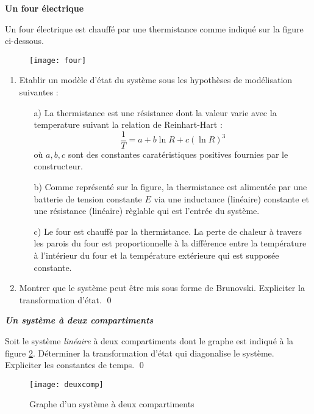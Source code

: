 \begin{exercice}{\bf Un four électrique}

Un four électrique est chauffé par une thermistance comme indiqué sur la figure ci-dessous.
\begin{figure}[h]
\begin{center}
\texttt{[image: four]}
\label{four}
\end{center}
\vspace{-5mm}
\end{figure}
\begin{enumerate}
\item Etablir un modèle d'état du système sous les hypothèses de modélisation suivantes :
\begin{itemize}
\item[a)] La thermistance est une résistance dont la valeur varie avec la temperature suivant la relation de Reinhart-Hart :
\begin{equation*}
\dfrac{1}{T} = a + b \ln R + c (\ln R)^3
\end{equation*}
où $a, b, c$ sont des constantes caratéristiques positives fournies par le constructeur.
\item [b)] Comme représenté sur la figure, la thermistance est alimentée par une batterie de tension constante $E$ via une inductance (linéaire) constante et une résistance (linéaire) règlable qui est l'entrée du système.
\item[c)] Le four est chauffé par la thermistance. La perte de chaleur à travers les parois du four est proportionnelle à la différence  entre la température à l'intérieur du four et la température extérieure qui est supposée constante. 
\end{itemize}
\item Montrer que le système peut être mis sous forme de Brunovski. Expliciter la transformation d'état. \qed
\end{enumerate}
\end{exercice}
\vv

\begin{exercice}{\bf \em Un système à deux compartiments}

Soit le système {\em linéaire} à deux compartiments dont le graphe
est indiqué à la figure \ref{Fig:deuxcomp}. Déterminer la transformation d'état qui diagonalise le
système. Expliciter les constantes de temps. \qed
\begin{figure}[h] 
   \centering
   \texttt{[image: deuxcomp]} 
   \caption{Graphe d'un système à deux compartiments}
   \label{Fig:deuxcomp}
\end{figure}
\end{exercice}


